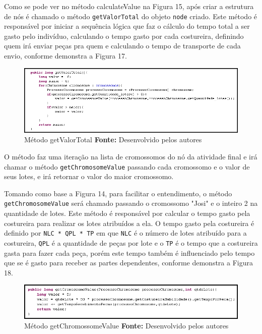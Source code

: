 \par Como se pode ver no método calculateValue na Figura 15, após criar a estrutura de nós é chamado 
o método \texttt{getValorTotal} do objeto \texttt{node} criado. Este método é responsável por iniciar a sequência lógica que
faz o cálculo do tempo total a ser gasto pelo indivíduo, calculando o tempo gasto por cada costureira, definindo quem irá enviar
peças pra quem e calculando o tempo de transporte de cada envio, conforme demonstra a Figura 17.

\begin{figure}[h!]
	\centerline{\includegraphics[scale=0.8]{./imagens/metodo_getValorTotal.png}}
	\caption[Distribuição de trabalho]
	{Método getValorTotal \textbf{Fonte:} Desenvolvido pelos autores}
	\label{fig:exemplo1}
\end{figure}

\par O método faz uma iteração na lista de cromossomos do nó da atividade final e irá chamar o método \texttt{getChromosomeValue} passando 
cada cromossomo e o valor de seus lotes, e irá retornar o valor do maior cromossomo.

\par Tomando como base a Figura 14, para facilitar o entendimento, o método \texttt{getChromosomeValue}
será chamado passando o cromossomo "Josi" e o inteiro 2 na quantidade de lotes. Este método é responsável por calcular o tempo gasto 
pela costureira para realizar os lotes atribuídos a ela. O tempo gasto pela costureira é definido por \texttt{NLC * QPL * TP} em que \texttt{NLC} é o número de lotes atribuído para a costureira, \texttt{QPL} é a quantidade de peças por lote e o \texttt{TP} é o tempo
que a costureira gasta para fazer cada peça, porém este tempo também é influenciado pelo tempo que se é gasto para receber as partes dependentes, conforme demonstra a Figura 18. 

\begin{figure}[h!]
	\centerline{\includegraphics[scale=0.8]{./imagens/metodo_getCromossomeValue.png}}
	\caption[Distribuição de trabalho]
	{Método getChromossomeValue \textbf{Fonte:} Desenvolvido pelos autores}
	\label{fig:exemplo1}
\end{figure}

